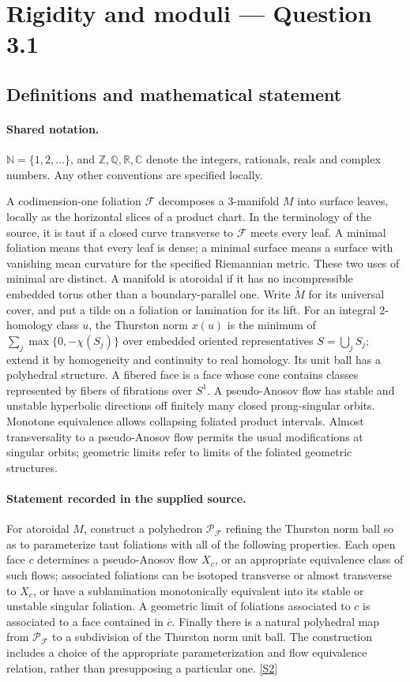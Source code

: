 \documentclass[11pt]{article}
\newcommand{\sref}[2]{\hyperlink{source:#1:#2}{[S#2]}}
\begin{document}
\section{Rigidity and moduli — Question 3.1}\label{statement}

\subsection{Definitions and mathematical statement}

\paragraph{Shared notation.}$\mathbb N=\{1,2,\ldots\}$, and $\mathbb Z,\mathbb Q,\mathbb R,\mathbb C$ denote the integers, rationals, reals and complex numbers. Any other conventions are specified locally.


A codimension-one foliation $\mathcal F$ decomposes a $3$-manifold $M$ into surface leaves, locally as the horizontal slices of a product chart. In the terminology of the source, it is taut if a closed curve transverse to $\mathcal F$ meets every leaf. A minimal foliation means that every leaf is dense; a minimal surface means a surface with vanishing mean curvature for the specified Riemannian metric. These two uses of minimal are distinct. A manifold is atoroidal if it has no incompressible embedded torus other than a boundary-parallel one. Write $\widetilde M$ for its universal cover, and put a tilde on a foliation or lamination for its lift. For an integral $2$-homology class $u$, the Thurston norm $x(u)$ is the minimum of $\sum_j\max\{0,-\chi(S_j)\}$ over embedded oriented representatives $S=\bigcup_j S_j$; extend it by homogeneity and continuity to real homology. Its unit ball has a polyhedral structure. A fibered face is a face whose cone contains classes represented by fibers of fibrations over $S^1$. A pseudo-Anosov flow has stable and unstable hyperbolic directions off finitely many closed prong-singular orbits. Monotone equivalence allows collapsing foliated product intervals. Almost transversality to a pseudo-Anosov flow permits the usual modifications at singular orbits; geometric limits refer to limits of the foliated geometric structures.
\paragraph{Statement recorded in the supplied source.}
For atoroidal $M$, construct a polyhedron $\mathscr P_{\mathcal F}$ refining the Thurston norm ball so as to parameterize taut foliations with all of the following properties. Each open face $c$ determines a pseudo-Anosov flow $X_c$, or an appropriate equivalence class of such flows; associated foliations can be isotoped transverse or almost transverse to $X_c$, or have a sublamination monotonically equivalent into its stable or unstable singular foliation. A geometric limit of foliations associated to $c$ is associated to a face contained in $\overline c$. Finally there is a natural polyhedral map from $\mathscr P_{\mathcal F}$ to a subdivision of the Thurston norm unit ball. The construction includes a choice of the appropriate parameterization and flow equivalence relation, rather than presupposing a particular one. \sref{statement}{2}
\end{document}
